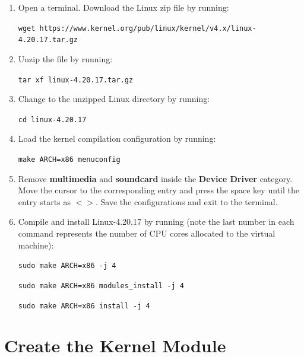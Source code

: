 \documentclass[11pt,letterpaper,titlepage]{article}
\begin{document}
\begin{enumerate}
    
    \item Open a terminal. Download the Linux zip file by running:
    
    \texttt{wget https://www.kernel.org/pub/linux/kernel/v4.x/linux-4.20.17.tar.gz}
    
    \item Unzip the file by running:
    
    \texttt{tar xf linux-4.20.17.tar.gz}
    
    \item Change to the unzipped Linux directory by running:
    
    \texttt{cd linux-4.20.17}
    
    \item Load the kernel compilation configuration by running:
    
    \texttt{make ARCH=x86 menuconfig}
    
    \item Remove \textbf{multimedia} and \textbf{soundcard} inside the \textbf{Device Driver} category. Move the cursor to the corresponding entry and press the space key until the entry starts as $<>$. Save the configurations and exit to the terminal.
    
    \item Compile and install Linux-4.20.17 by running (note the last number in each command represents the number of CPU cores allocated to the virtual machine):
    
    \texttt{sudo make ARCH=x86 -j 4}
    
    \texttt{sudo make ARCH=x86 modules\_install -j 4}
    
    \texttt{sudo make ARCH=x86 install -j 4}
    
\end{enumerate}

\section{Create the Kernel Module}
\end{document}
